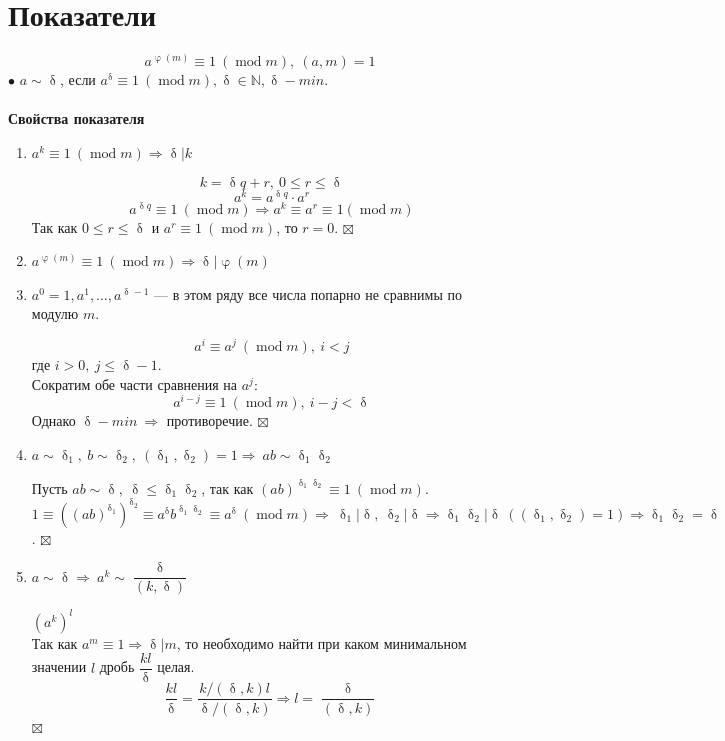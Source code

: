 \documentclass[a4paper, 12pt]{article}
\newenvironment{Proof}
{\par\noindent{$\blacklozenge$}}
{\hfill$\scriptstyle\boxtimes$}
\renewcommand{\mod}{\operatorname{mod}}
\newcommand{\N}{\mathbb{N}}
\renewcommand{\delta}{\updelta}
\renewcommand{\varphi}{\upvarphi}
\begin{document}
\section{Показатели}
$$a^{\varphi(m)} \equiv 1 \ (\mod m), \ (a, m) = 1$$
$\bullet$ $a \sim \delta$, если $a^\delta \equiv 1 \ (\mod m), \delta \in \N, \delta - min$.\\\\
\textbf{Свойства показателя}
\begin{enumerate}
    \item $a^k \equiv 1 \ (\mod m) \Rightarrow \delta | k$
    \begin{Proof}
        $$k = \delta q + r, \ 0 \leq r \leq \delta$$
        $$a^k = a^{\delta q} \cdot a^r$$
        $$a^{\delta q} \equiv 1 \ (\mod m) \Rightarrow a^k \equiv a^r \equiv 1 (\mod m)$$
        Так как $0 \leq r \leq \delta$ и $a^r \equiv 1 \ (\mod m)$, то $r = 0$. 
    \end{Proof}
    \item $a^{\varphi(m)} \equiv 1 \ (\mod m) \Rightarrow \delta | \varphi(m)$
    \item $a^0 = 1, a^1, \dots, a^{\delta -1 }$ --- в этом ряду все числа попарно не сравнимы по модулю $m$.
    \begin{Proof}
        $$a^i \equiv a^j \ (\mod m), \ i < j$$
        где $i > 0, \ j \leq \delta -1$.\\
        Сократим обе части сравнения на $a^j$:
        $$a^{i-j} \equiv 1 \ (\mod m), \ i - j < \delta$$
        Однако $\delta - min \ \Rightarrow$ противоречие.
    \end{Proof}
    \item $a \sim \delta_1, \ b \sim \delta_2, \ (\delta_1, \delta_2) = 1 \Rightarrow \ ab \sim \delta_1\delta_2$
    \begin{Proof}
        Пусть $ab \sim \delta, \ \delta \leq \delta_1\delta_2$, так как $(ab)^{\delta_1\delta_2} \equiv 1 \ (\mod m)$.\\
        $1 \equiv ((ab)^{\delta_1})^{\delta_2} \equiv a^\delta b^{\delta_1\delta_2} \equiv  a^\delta \ (\mod m) \Rightarrow \ \delta_1 | \delta, \ \delta_2 | \delta \Rightarrow \delta_1\delta_2 | \delta \ ((\delta_1, \delta_2)=1) \Rightarrow \delta_1\delta_2=\delta$.
    \end{Proof}
    \item $a \sim \delta \Rightarrow \ a^k \sim \dfrac{\delta}{(k, \delta)}$
    \begin{Proof}
        $(a^k)^l$\\
        Так как $a^m \equiv 1 \Rightarrow \delta | m$, то необходимо найти при каком минимальном значении $l$ дробь $\dfrac{kl}{\delta}$ целая.
        $$\dfrac{kl}{\delta} = \dfrac{k/(\delta, k)l}{\delta/(\delta, k)} \Rightarrow l = \dfrac{\delta}{(\delta, k)}$$
    \end{Proof}
\end{enumerate}
\end{document}

